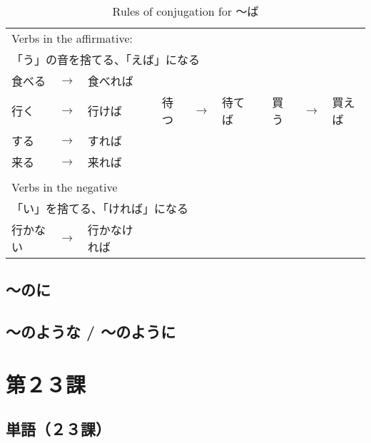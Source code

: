 \documentclass[notoc,notitlepage]{tufte-book}
\begin{document}
\begin{table*}[ht]
  \centering
  \caption{Rules of conjugation for 〜ば}
  \label{table:rules_of_conjugation_for_ba}
  \begin{tabular}{l c l c l c l c l c l}
  \multicolumn{11}{l}{Verbs in the affirmative:} \\
  \multicolumn{11}{l}{「う」の音を捨てる、「えば」になる} \\
  食べる & $\to$ & 食べれば \\
  行く   & $\to$ & 行けば &  & 待つ & $\to$ & 待てば &  & 買う & $\to$ & 買えば \\
  する   & $\to$ & すれば \\
  来る   & $\to$ & 来れば \\
  $  $ \\
  \multicolumn{11}{l}{Verbs in the negative} \\
  \multicolumn{11}{l}{「い」を捨てる、「ければ」になる} \\
  行かない & $\to$ & 行かなければ
  \end{tabular}
\end{table*}


\section{〜のに}%
\label{sec:noni}




\section{〜のような / 〜のように}%
\label{sec:noyouna_noyouni}





\chapter{第２３課}%
\label{chp:dai_23_ka}

\section{単語（２３課）}%
\label{sec:tango_c23}
\end{document}
